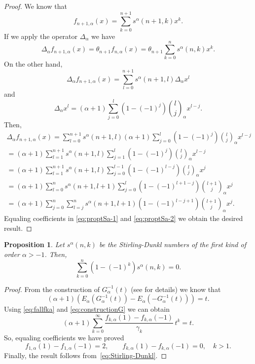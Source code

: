 \documentclass[11pt,a4paper]{article}
\theoremstyle{plain}
\newtheorem{proposition}[theorem]{Proposition}
\theoremstyle{remark}
\newcommand{\Ea}{E_{\alpha}}
\newcommand{\binoma}[2]{\binom{#1}{#2}_{\!\alpha}}
\begin{document}
\begin{proof}
We know that
\[
  f_{n+1,\alpha}(x) = \sum_{k=0}^{n+1} s^{\alpha}(n+1,k)x^k.
\]
If we apply the operator $\Delta_{\alpha}$ we have
\begin{equation}
\label{eq:proptSa-1}
  \Delta_{\alpha}f_{n+1,\alpha}(x) = \theta_{n+1}f_{n,\alpha}(x)
  = \theta_{n+1}\sum_{k=0}^n s^{\alpha}(n,k)x^k.
\end{equation}
On the other hand,
\[
  \Delta_{\alpha}f_{n+1,\alpha}(x)
  = \sum_{l=0}^{n+1} s^{\alpha}(n+1,l) \Delta_{\alpha}x^l
\]
and
\[
  \Delta_{\alpha}x^l = (\alpha+1)\sum_{j=0}^l (1-(-1)^j) \binoma{l}{j}x^{l-j}.
\]
Then,
\begin{multline}
\label{eq:proptSa-2}
  \Delta_{\alpha}f_{n+1,\alpha}(x)
  = \sum_{l=0}^{n+1}s^{\alpha}(n+1,l)(\alpha+1) \sum_{j=0}^l (1-(-1)^j) \binoma{l}{j}x^{l-j} \\
  = (\alpha+1) \sum_{l=1}^{n+1} s^{\alpha}(n+1,l) \sum_{j=1}^l (1-(-1)^j) \binoma{l}{j}x^{l-j} \\
  = (\alpha+1) \sum_{l=1}^{n+1} s^{\alpha}(n+1,l) \sum_{j=0}^{l-1} (1-(-1)^{l-j}) \binoma{l}{j}x^{j} \\
  = (\alpha+1) \sum_{l=0}^{n} s^{\alpha}(n+1,l+1) \sum_{j=0}^{l} (1-(-1)^{l+1-j}) \binoma{l+1}{j}x^{j} \\
  = (\alpha+1) \sum_{j=0}^n \sum_{l=j}^n s^{\alpha}(n+1,l+1) (1-(-1)^{l-j+1}) \binoma{l+1}{j}x^j.
\end{multline}
Equaling coefficients in \eqref{eq:proptSa-1} and \eqref{eq:proptSa-2} we obtain the desired result.
\end{proof}

\begin{proposition}
\label{prop:rel=0} 
Let $s^{\alpha}(n,k)$ be the Stirling-Dunkl numbers of the first kind of order $\alpha>-1$. Then,
\[
  \sum_{k=0}^n (1-(-1)^k) s^{\alpha}(n,k)=0.
\]
\end{proposition}

\begin{proof}
From the construction of $G_{\alpha}^{-1}(t)$ (see \cite{ELMV} for details) we know that
\begin{equation}
\label{eq:constructionG}
  (\alpha+1)(\Ea(G_{\alpha}^{-1}(t))-\Ea(-G_{\alpha}^{-1}(t))) = t.
\end{equation}
Using \eqref{eq:fallfka} and \eqref{eq:constructionG} we can obtain
\[
  (\alpha+1) \sum_{k=0}^{\infty} \frac{f_{k,\alpha}(1)-f_{k,\alpha}(-1)}{\gamma_k} \,t^k = t.
\]
So, equaling coefficients we have proved
\begin{equation}
\label{eq:fact_1}
  f_{1,\alpha}(1)-f_{1,\alpha}(-1)=2,\qquad
  f_{k,\alpha}(1)-f_{k,\alpha}(-1)=0,\quad k>1.
\end{equation}
Finally, the result follows from~\eqref{eq:Stirling-Dunkl}.
\end{proof}
\end{document}
